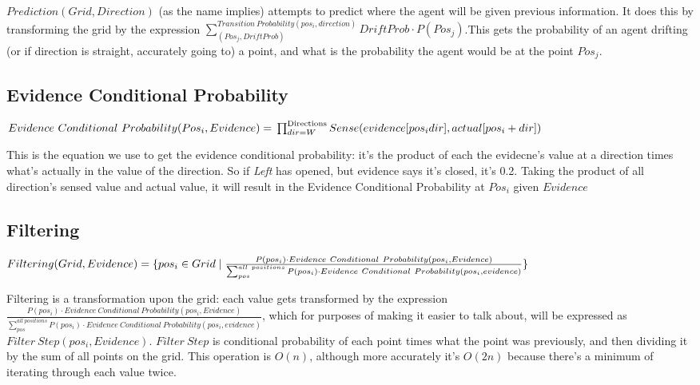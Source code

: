 \documentclass[11pt]{article}
\begin{document}
\(Prediction(Grid, Direction)\) (as the name implies) attempts to predict where the agent will be given previous information. It does this by transforming the grid by the expression  \(\sum^{Transition\ Probability(pos_i, direction)}_{(Pos_j, DriftProb)} DriftProb \cdot P(Pos_j)\).This gets the probability of an agent drifting (or if direction is straight, accurately going to) a point, and what is the probability the agent would be at the point \(Pos_j\).


\subsection*{Evidence Conditional Probability}
\label{sec:org8a85bb2}
   \begin{math}
  Evidence\ Conditional\ Probability(Pos_i, Evidence)= \\
  \prod^{\text{Directions} }_{dir=W} Sense(evidence[pos_i dir], actual[pos_i+dir])
\end{math}

This is the equation we use to get the evidence conditional probability: it's the product of each the evidecne's value at a direction times what's actually in the value of the direction. So if \emph{Left} has opened, but evidence says it's closed, it's 0.2. Taking the product of all direction's sensed value and actual value, it will result in the Evidence Conditional Probability at \(Pos_i\) given \(Evidence\)

\subsection*{Filtering}
\label{sec:orgbf77652}


   \begin{math}
Filtering(Grid, Evidence) = \{pos_i \in Grid \mid\\
\frac{P(pos_i) \cdot Evidence\ Conditional\ Probability(pos_i, Evidence) }{\sum^{all\ positions}_{pos} P(pos_i) \cdot Evidence\ Conditional\ Probability(pos_i, evidence) } \}
\end{math}



Filtering is a transformation upon the grid: each value gets transformed by the expression \(\frac{P(pos_i) \cdot Evidence\ Conditional\ Probability(pos_i, Evidence) }{\sum^{all\ positions}_{pos} P(pos_i) \cdot Evidence\ Conditional\ Probability(pos_i, evidence) }\), which for purposes of making it easier to talk about, will be expressed as \(Filter\ Step(pos_i, Evidence)\). \(Filter\ Step\) is conditional probability of each point times what the point was previously, and then dividing it  by the sum of all points on the grid. This operation is \(O(n)\), although more accurately it's \(O(2n)\) because there's a minimum of iterating through each value twice.
\end{document}
